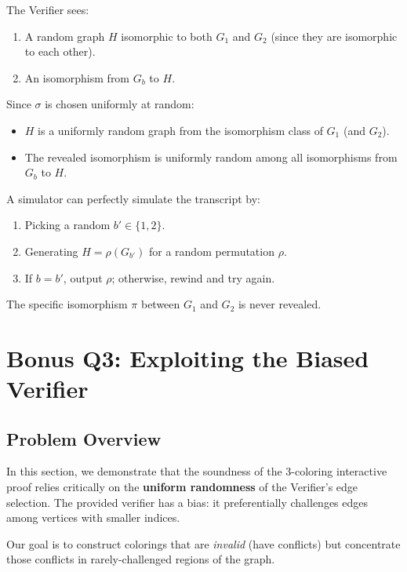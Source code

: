 \documentclass[11pt]{article}
\begin{document}
The Verifier sees:
\begin{enumerate}
    \item A random graph $H$ isomorphic to both $G_1$ and $G_2$ (since they are isomorphic to each other).
    \item An isomorphism from $G_b$ to $H$.
\end{enumerate}

Since $\sigma$ is chosen uniformly at random:
\begin{itemize}
    \item $H$ is a uniformly random graph from the isomorphism class of $G_1$ (and $G_2$).
    \item The revealed isomorphism is uniformly random among all isomorphisms from $G_b$ to $H$.
\end{itemize}

A simulator can perfectly simulate the transcript by:
\begin{enumerate}
    \item Picking a random $b' \in \{1, 2\}$.
    \item Generating $H = \rho(G_{b'})$ for a random permutation $\rho$.
    \item If $b = b'$, output $\rho$; otherwise, rewind and try again.
\end{enumerate}

The specific isomorphism $\pi$ between $G_1$ and $G_2$ is never revealed.

\section{Bonus Q3: Exploiting the Biased Verifier}

\subsection{Problem Overview}

In this section, we demonstrate that the soundness of the 3-coloring interactive proof relies critically on the \textbf{uniform randomness} of the Verifier's edge selection. The provided verifier has a bias: it preferentially challenges edges among vertices with smaller indices.

Our goal is to construct colorings that are \textit{invalid} (have conflicts) but concentrate those conflicts in rarely-challenged regions of the graph.
\end{document}
